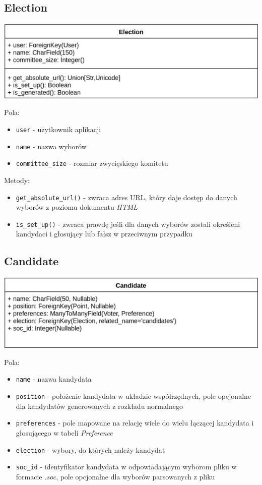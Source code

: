 \documentclass[pdflatex,11pt]{../aghdoc_version2}
\newcommand{\code}[1]{\texttt{#1}}
\begin{document}
\subsection{Election}
\begin{center}
\centerline{\includegraphics[scale=0.85]{pics/Election.png}}
\end{center}
Pola:
\begin{itemize}
\item \code{user} - użytkownik aplikacji
\item \code{name} - nazwa wyborów
\item \code{committee\_size} - rozmiar zwycięskiego komitetu
\end{itemize}
Metody:
\begin{itemize}
\item \code{get\_absolute\_url()} - zwraca adres URL, który daje dostęp do danych wyborów z
poziomu dokumentu \textit{HTML}
\item \code{is\_set\_up()} - zwraca prawdę jeśli dla danych wyborów zostali określeni kandydaci i
głosujący lub fałsz w przeciwnym przypadku
\end{itemize}
\clearpage

\subsection{Candidate}
\begin{center}
\centerline{\includegraphics[scale=0.85]{pics/Candidate.png}}
\end{center}
Pola:
\begin{itemize}
\item \code{name} - nazwa kandydata
\item \code{position} - położenie kandydata w układzie współrzędnych, pole opcjonalne dla
kandydatów generowanych z rozkładu normalnego
\item \code{preferences} - pole mapowane na relację wiele do wielu łączącej kandydata i
głosującego w tabeli \textit{Preference}
\item \code{election} - wybory, do których należy kandydat
\item \code{soc\_id} - identyfikator kandydata w odpowiadającym wyborom pliku w formacie \textit{.soc},
pole opcjonalne dla wyborów parsowanych z pliku
\end{itemize}
\end{document}
